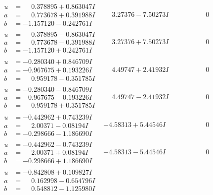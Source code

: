 \documentclass[1p]{elsarticle_modified}
\theoremstyle{definition}
\begin{document}
$$\begin{array}{c|c|c}
\begin{aligned}
u &= \phantom{-}0.378895 + 0.863047 I \\
a &= \phantom{-}0.773678 + 0.391988 I \\
b &= -1.157120 - 0.242761 I\end{aligned}
 & \phantom{-}3.27376 - 7.50273 I & \phantom{-0.000000 } 0 \\ \hline\begin{aligned}
u &= \phantom{-}0.378895 - 0.863047 I \\
a &= \phantom{-}0.773678 - 0.391988 I \\
b &= -1.157120 + 0.242761 I\end{aligned}
 & \phantom{-}3.27376 + 7.50273 I & \phantom{-0.000000 } 0 \\ \hline\begin{aligned}
u &= -0.280340 + 0.846709 I \\
a &= -0.967675 + 0.193226 I \\
b &= \phantom{-}0.959178 - 0.351785 I\end{aligned}
 & \phantom{-}4.49747 + 2.41932 I & \phantom{-0.000000 } 0 \\ \hline\begin{aligned}
u &= -0.280340 - 0.846709 I \\
a &= -0.967675 - 0.193226 I \\
b &= \phantom{-}0.959178 + 0.351785 I\end{aligned}
 & \phantom{-}4.49747 - 2.41932 I & \phantom{-0.000000 } 0 \\ \hline\begin{aligned}
u &= -0.442962 + 0.743239 I \\
a &= \phantom{-}2.00371 - 0.08194 I \\
b &= -0.298666 - 1.186690 I\end{aligned}
 & -4.58313 + 5.44546 I & \phantom{-0.000000 } 0 \\ \hline\begin{aligned}
u &= -0.442962 - 0.743239 I \\
a &= \phantom{-}2.00371 + 0.08194 I \\
b &= -0.298666 + 1.186690 I\end{aligned}
 & -4.58313 - 5.44546 I & \phantom{-0.000000 } 0 \\ \hline\begin{aligned}
u &= -0.842808 + 0.109827 I \\
a &= \phantom{-}0.162998 - 0.654796 I \\
b &= \phantom{-}0.548812 - 1.125980 I\end{aligned}

\end{array}$$
\end{document}
